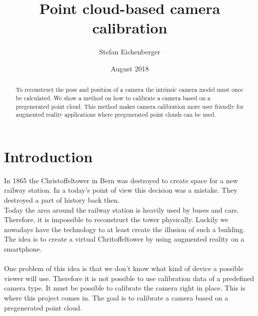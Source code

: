 \documentclass[11pt,a4paper,titlepage,oneside]{report}
\title{Point cloud-based camera calibration}
\author{Stefan Eichenberger}
\date{August 2018}
\begin{document}
\maketitle

\begin{abstract}
To reconstruct the pose and position of a camera the intrinsic camera model must once be calculated. We show a method on how to calibrate a camera based on a pregenerated point cloud. This method makes camera calibration more user friendly for augmented reality applications where pregenerated point clouds can be used.
\end{abstract}

\tableofcontents

\chapter{Introduction}
In 1865 the Christoffeltower in Bern was destroyed to create space for a new railway station. In a today's point of view this decision was a mistake. They destroyed a part of history back then.\\
Today the area around the railway station is heavily used by buses and cars. Therefore, it is impossible to reconstruct the tower physically. Luckily we nowadays have the technology to at least create the illusion of such a building. The idea is to create a virtual Chritoffeltower by using augmented reality on a smartphone.\\\\
One problem of this idea is that we don't know what kind of device a possible viewer will use. Therefore it is not possible to use calibration data of a predefined camera type. It must be possible to calibrate the camera right in place. This is where this project comes in. The goal is to calibrate a camera based on a pregenerated point cloud.
\end{document}
